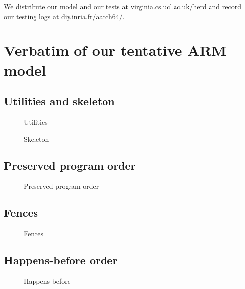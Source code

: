 \documentclass[a4paper]{article}
\begin{document}
We distribute our model and our tests at \url{virginia.cs.ucl.ac.uk/herd} and
record our testing logs at \url{diy.inria.fr/aarch64/}.


\clearpage

\section{Verbatim of our tentative ARM model}

\subsection{Utilities and skeleton}

\begin{figure}[!h]
\begin{center}

\end{center}
\caption{Utilities}
\end{figure}

\begin{figure}[!h]
\begin{center}

\end{center}
\caption{Skeleton}
\end{figure}

\subsection{Preserved program order}

\begin{figure}[!h]

\caption{Preserved program order}
\end{figure}

\subsection{Fences}

\begin{figure}[!h]

\caption{Fences}
\end{figure}

\clearpage

\subsection{Happens-before order}

\begin{figure}[!h]

\caption{Happens-before}
\end{figure}
\end{document}
